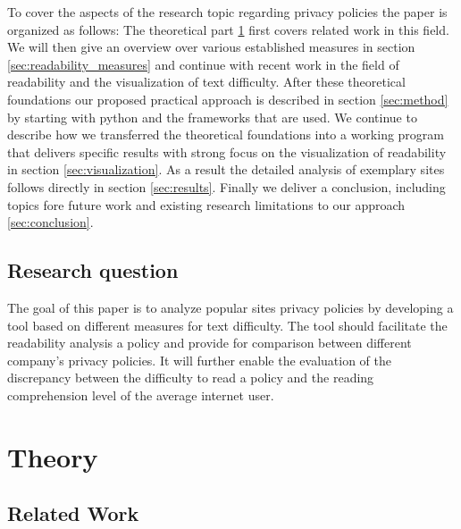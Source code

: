 \documentclass[runningheads,a4paper]{llncs}
\begin{document}
To cover the aspects of the research topic regarding privacy policies the paper is organized as follows: The theoretical part \ref{sec:theory} first covers related work in this field. We will then give an overview over various established measures in section \ref{sec:readability_measures} and continue with recent work in the field of readability and the visualization of text difficulty. After these theoretical foundations our proposed practical approach is described in section \ref{sec:method} by starting with python and the frameworks that are used. We continue to describe how we transferred the theoretical foundations into a working program that delivers specific results with strong focus on the visualization of readability in section \ref{sec:visualization}. As a result the detailed analysis of exemplary sites follows directly in section \ref{sec:results}.
Finally we deliver a conclusion, including topics fore future work and existing research limitations to our approach \ref{sec:conclusion}.


\subsection{Research question}\label{sec:researchquestion}
The goal of this paper is to analyze popular sites privacy policies by developing a tool based on different measures for text difficulty.
The tool should facilitate the readability analysis a policy and provide for comparison between different company's privacy policies. 
It will further enable the evaluation of the discrepancy between the difficulty to read a policy and the reading comprehension level of the average internet user.

\section{Theory}\label{sec:theory}
\subsection{Related Work}\label{sec:relatedwork}
\end{document}
